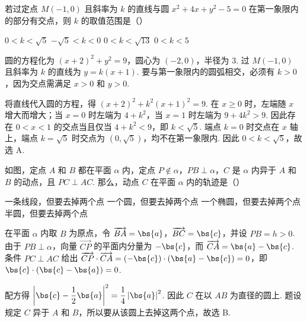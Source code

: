 \begin{problem}
若过定点 \(M(-1,0)\) 且斜率为 \(k\) 的直线与圆 \(x^{2} + 4x + y^{2} - 5 = 0\) 在第一象限内的部分有交点，则 \(k\) 的取值范围是（\quad）

\choices
    {\(0 < k < \sqrt{5}\)}
    {\(-\sqrt{5} < k < 0\)}
    {\(0 < k < \sqrt{13}\)}
    {\(0 < k < 5\)}
\begin{solution}
圆的方程化为 \((x+2)^2+y^2=9\)，圆心为 \((-2,0)\)，半径为 \(3\). 过 \(M(-1,0)\) 且斜率为 \(k\) 的直线为 \(y=k(x+1)\). 要与第一象限内的圆弧相交，必须有 \(k>0\)，因为交点需满足 \(x>0\) 和 \(y>0\).

将直线代入圆的方程，得
\((x+2)^2+k^2(x+1)^2=9\). 在 \(x\geqslant0\) 时，左端随 \(x\) 增大而增大；当 \(x=0\) 时左端为 \(4+k^2\)，当 \(x=1\) 时左端为 \(9+4k^2>9\). 因此存在 \(0<x<1\) 的交点当且仅当 \(4+k^2<9\)，即 \(k<\sqrt5\). 端点 \(k=0\) 时交点在 \(x\) 轴上，端点 \(k=\sqrt5\) 时交点为 \((0,\sqrt5)\)，均不在第一象限内. 因此 \(0<k<\sqrt5\)，故选 A.
\end{solution}
\end{problem}

\begin{problem}
如图，定点 \(A\) 和 \(B\) 都在平面 \(\alpha\) 内，定点 \(P\notin \alpha\)，\(PB \perp \alpha\)，\(C\) 是 \(\alpha\) 内异于 \(A\) 和 \(B\) 的动点，且 \(PC \perp AC\). 那么，动点 \(C\) 在平面 \(\alpha\) 内的轨迹是（\quad）


\choices
    {一条线段，但要去掉两个点}
    {一个圆，但要去掉两个点}
    {一个椭圆，但要去掉两个点}
    {半圆，但要去掉两个点}
\begin{solution}
在平面 \(\alpha\) 内取 \(B\) 为原点，令 \(\overrightarrow{BA}=\bs{a}\)，\(\overrightarrow{BC}=\bs{c}\)，并设 \(PB=h>0\). 由于 \(PB\perp\alpha\)，向量 \(\overrightarrow{CP}\) 的平面内分量为 \(-\bs{c}\)，而 \(\overrightarrow{CA}=\bs{a}-\bs{c}\). 条件 \(PC\perp AC\) 给出
\(\overrightarrow{CP}\cdot\overrightarrow{CA}=(-\bs{c})\cdot(\bs{a}-\bs{c})=0\)，即 \(\bs{c}\cdot(\bs{c}-\bs{a})=0\).

配方得
\(\left|\bs{c}-\dfrac12\bs{a}\right|^2=\dfrac14\left|\bs{a}\right|^2\). 因此 \(C\) 在以 \(AB\) 为直径的圆上. 题设规定 \(C\) 异于 \(A\) 和 \(B\)，所以要从该圆上去掉这两个点，故选 B.
\end{solution}
\end{problem}

